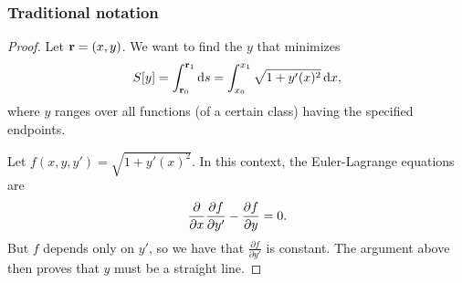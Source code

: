 \subsubsection{Traditional notation}
\begin{proof}
  Let $\mathbf{r} = (x, y)$. We want to find the $y$ that minimizes
\begin{align*}
  S[y] = \int_{\r_0}^{\r_1}\ds = \int_{x_0}^{x_1}\sqrt{1 + y'(x)^2} \dx,
\end{align*}
where $y$ ranges over all functions (of a certain class) having the specified endpoints.

Let $f(x, y, y') = \sqrt{1 + y'(x)^2}$. In this context, the Euler-Lagrange equations are
\begin{align*}
  \frac{\partial}{\partial x} \frac{\partial f}{\partial y'} - \frac{\partial f}{\partial y} = 0.
\end{align*}
But $f$ depends only on $y'$, so we have that $\frac{\partial f}{\partial y'} $ is constant. The argument above
then proves that $y$ must be a straight line.
\end{proof}


